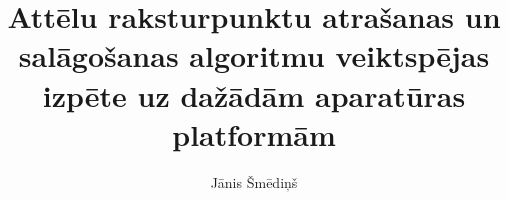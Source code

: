 \documentclass[magjistrs]{vea-diplomdarbs}
\title{Attēlu raksturpunktu atrašanas un salāgošanas algoritmu veiktspējas
       izpēte uz dažādām aparatūras platformām}
\author{Jānis Šmēdiņš}
\begin{document}
	\maketitle
	\onehalfspacing %
	\tableofcontents\clearpage
	\sloppy %
	
	
	
	
	
	
	\clearpage %
	
	
	
	
	\clearpage
	
\end{document}
